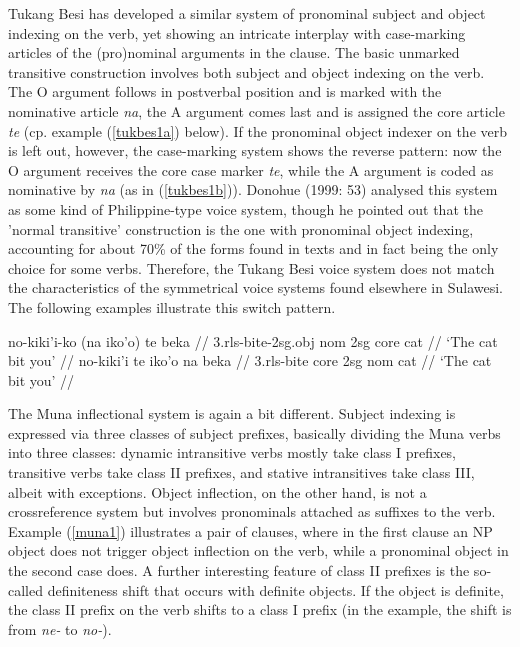 Tukang Besi has developed a similar system of pronominal subject and object indexing on the verb, yet showing an intricate interplay with case-marking articles of the (pro)nominal arguments in the clause. The basic unmarked transitive construction involves both subject and object indexing on the verb. The O argument follows in postverbal position and is marked with the nominative article \textit{na}, the A argument comes last and is assigned the core article \textit{te} (cp. example (\ref{tukbes1a}) below). If the pronominal object indexer on the verb is left out, however, the case-marking system shows the reverse pattern: now the O argument receives the core case marker \textit{te}, while the A argument is coded as nominative by \textit{na} (as in (\ref{tukbes1b})). Donohue (1999: 53) analysed this system as some kind of Philippine-type voice system, though he pointed out that the 'normal transitive' construction is the one with pronominal object indexing, accounting for about 70\% of the forms found in texts and in fact being the only choice for some verbs. Therefore, the Tukang Besi voice system does not match the characteristics of the symmetrical voice systems found elsewhere in Sulawesi. The following examples illustrate this switch pattern.

\pex 
\a \label{tukbes1a}
\begingl
\gla no-kiki'i-ko (na iko'o) te beka // 
\glb \acs{3}.\acs{rls}-bite-\acs{2}\acs{sg}.\acs{obj} \acs{nom} \acs{2}\acs{sg} \acs{core} cat //
\glft `The cat bit you' // 
\endgl
\a \label{tukbes1b}
\begingl
\gla no-kiki'i te iko'o na beka // 
\glb \acs{3}.\acs{rls}-bite \acs{core} \acs{2}\acs{sg} \acs{nom} cat //
\glft `The cat bit you' // 
\endgl
\xe

The Muna inflectional system is again a bit different. Subject indexing is expressed via three classes of subject prefixes, basically dividing the Muna verbs into three classes: dynamic intransitive verbs mostly take class I prefixes, transitive verbs take class II prefixes, and stative intransitives take class III, albeit with exceptions. Object inflection, on the other hand, is not a crossreference system but involves pronominals attached as suffixes to the verb. Example (\ref{muna1}) illustrates a pair of clauses, where in the first clause an NP object does not trigger object inflection on the verb, while a pronominal object in the second case does. A further interesting feature of class II prefixes is the so-called definiteness shift that occurs with definite objects. If the object is definite, the class II prefix on the verb shifts to a class I prefix (in the example, the shift is from \textit{ne-} to \textit{no-}).

